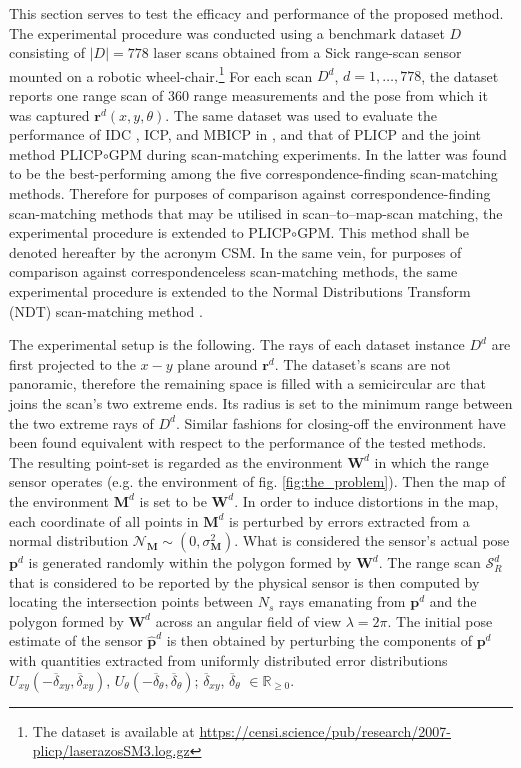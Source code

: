 This section serves to test the efficacy and performance of the proposed
method. The experimental procedure was conducted using a benchmark dataset $D$
consisting of $|D| = 778$ laser scans obtained from a Sick range-scan sensor
mounted on a robotic wheel-chair.\footnote{The dataset is available at
\url{https://censi.science/pub/research/2007-plicp/laserazosSM3.log.gz}} For
each scan $D^d$, $d = 1,\dots,778$, the dataset reports one range scan of $360$
range measurements and the pose from which it was captured
$\bm{r}^d(x,y,\theta)$.  The same dataset was used to evaluate the performance
of IDC \cite{idc}, ICP, and MBICP in \cite{mbicp}, and that of PLICP and the
joint method PLICP$\circ$GPM during scan-matching experiments. In \cite{plicp}
the latter was found to be the best-performing among the five
correspondence-finding scan-matching methods. Therefore for purposes of
comparison against correspondence-finding scan-matching methods that may be
utilised in scan--to--map-scan matching, the experimental procedure is extended
to PLICP$\circ$GPM. This method shall be denoted hereafter by the acronym CSM.
In the same vein, for purposes of comparison against correspondenceless
scan-matching methods, the same experimental procedure is extended to the
Normal Distributions Transform (NDT) scan-matching method \cite{ndt1}.

The experimental setup is the following. The rays of each dataset instance
$D^d$ are first projected to the $x-y$ plane around $\bm{r}^d$. The
dataset's scans are not panoramic, therefore the remaining space is filled
with a semicircular arc that joins the scan's two extreme ends. Its radius is
set to the minimum range between the two extreme rays of $D^d$. Similar
fashions for closing-off the environment have been found equivalent with
respect to the performance of the tested methods. The resulting point-set is
regarded as the environment $\bm{W}^d$ in which the range sensor operates (e.g.
the environment of fig. \ref{fig:the_problem}). Then the map of the environment
$\bm{M}^d$ is set to be $\bm{W}^d$. In order to induce distortions in the map,
each coordinate of all points in $\bm{M}^d$ is perturbed by errors extracted
from a normal distribution $\mathcal{N}_{\bm{M}} \sim (0, \sigma_{\bm{M}}^2)$.
What is considered the sensor's actual pose $\bm{p}^d$ is generated randomly
within the polygon formed by $\bm{W}^d$. The range scan $\mathcal{S}_R^d$ that
is considered to be reported by the physical sensor is then computed by
locating the intersection points between $N_s$ rays emanating from $\bm{p}^d$
and the polygon formed by $\bm{W}^d$ across an angular field of view $\lambda =
2\pi$.  The initial pose estimate of the sensor $\hat{\bm{p}}^d$ is then
obtained by perturbing the components of $\bm{p}^d$ with quantities extracted
from uniformly distributed error distributions
$U_{xy}(-\overline{\delta}_{xy}, \overline{\delta}_{xy})$,
$U_{\theta}(-\overline{\delta}_{\theta}, \overline{\delta}_{\theta})$;
$\overline{\delta}_{xy}$, $\overline{\delta}_\theta$
$\in \mathbb{R}_{\geq 0}$.

